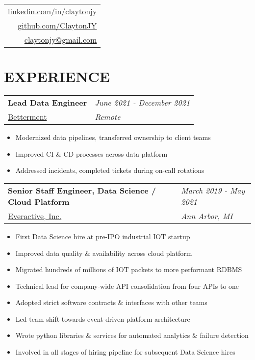 \documentclass[margin,line]{res}
\begin{document}


\begin{resume}

\vspace{-.15in}
\hfill
\begin{tabular}{r}
  \href{http://www.linkedin.com/in/claytonjy}{linkedin.com/in/claytonjy}\\
  \href{https://github.com/ClaytonJY}{github.com/ClaytonJY} \\
  \href{mailto:claytonjy@gmail.com}{claytonjy@gmail.com} \\
\end{tabular}


\section{EXPERIENCE}

\begin{tabular}{p{4.4in} l}
  {\bf Lead Data Engineer} & \emph{June 2021 - December 2021}\\
  \href{https://betterment.com}{Betterment} & \emph{Remote}
\end{tabular}
\vspace{2pt}
\begin{itemize}\itemsep -2pt
  \item Modernized data pipelines, transferred ownership to client teams
  \item Improved CI \& CD processes across data platform
  \item Addressed incidents, completed tickets during on-call rotations
\end{itemize}

\begin{tabular}{p{4.4in} l}
  {\bf Senior Staff Engineer, Data Science / Cloud Platform} & \emph{March 2019 - May 2021}\\
  \href{https://everactive.com/}{Everactive, Inc.} & \emph{Ann Arbor, MI}
\end{tabular}
\vspace{2pt}
\begin{itemize}\itemsep -2pt
  \item First Data Science hire at pre-IPO industrial IOT startup
  \item Improved data quality \& availability across cloud platform
  \item Migrated hundreds of millions of IOT packets to more performant RDBMS
  \item Technical lead for company-wide API consolidation from four APIs to one
  \item Adopted strict software contracts \& interfaces with other teams
  \item Led team shift towards event-driven platform architecture
  \item Wrote python libraries \& services for automated analytics \& failure detection
  \item Involved in all stages of hiring pipeline for subsequent Data Science hires
\end{itemize}


\end{resume}
\end{document}
